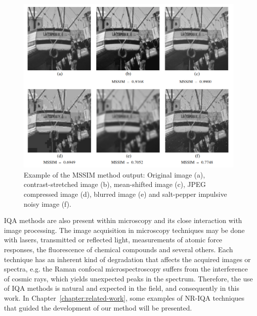 \begin{figure}[H]
	\centering
	\caption{\label{fig:mssim_IQA_exampe} Example of the MSSIM method output: Original image (a), contrast-stretched image (b), mean-shifted image (c), JPEG compressed image (d), blurred image (e) and salt-pepper impulsive noisy image (f).}
	\begin{center}
    \includegraphics[scale=0.45]{images/mssim_IQA.png}
	\end{center}
	\centering
\end{figure}

IQA methods are also present within microscopy and its close interaction with image processing. The image acquisition in microscopy techniques may be done with lasers, transmitted or reflected light, measurements of atomic force responses, the fluorescence of chemical compounds and several others. Each technique has an inherent kind of degradation that affects the acquired images or spectra, e.g. the Raman confocal microspectroscopy suffers from the interference of cosmic rays, which yields unexpected peaks in the spectrum. Therefore, the use of IQA methods is natural and expected in the field, and consequently in this work. In Chapter~\ref{chapter:related-work}, some examples of NR-IQA techniques that guided the development of our method will be presented.